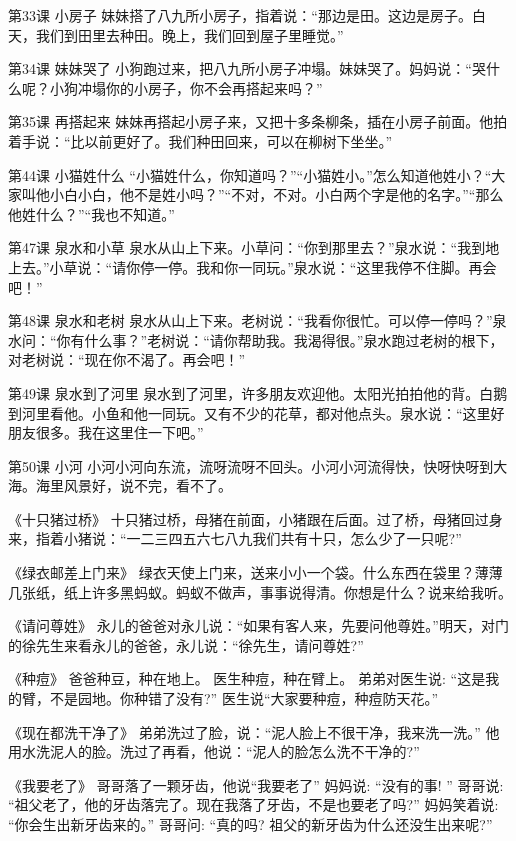 
第33课  小房子
妹妹搭了八九所小房子，指着说：“那边是田。这边是房子。白天，我们到田里去种田。晚上，我们回到屋子里睡觉。”
  
第34课  妹妹哭了
小狗跑过来，把八九所小房子冲塌。妹妹哭了。妈妈说：“哭什么呢？小狗冲塌你的小房子，你不会再搭起来吗？”
 
第35课  再搭起来
妹妹再搭起小房子来，又把十多条柳条，插在小房子前面。他拍着手说：“比以前更好了。我们种田回来，可以在柳树下坐坐。”
 
第44课  小猫姓什么
“小猫姓什么，你知道吗？”“小猫姓小。”怎么知道他姓小？“大家叫他小白小白，他不是姓小吗？”“不对，不对。小白两个字是他的名字。”“那么他姓什么？”“我也不知道。”
 
第47课  泉水和小草
泉水从山上下来。小草问：“你到那里去？”泉水说：“我到地上去。”小草说：“请你停一停。我和你一同玩。”泉水说：“这里我停不住脚。再会吧！”
 
第48课  泉水和老树
泉水从山上下来。老树说：“我看你很忙。可以停一停吗？”泉水问：“你有什么事？”老树说：“请你帮助我。我渴得很。”泉水跑过老树的根下，对老树说：“现在你不渴了。再会吧！”
 
第49课  泉水到了河里
泉水到了河里，许多朋友欢迎他。太阳光拍拍他的背。白鹅到河里看他。小鱼和他一同玩。又有不少的花草，都对他点头。泉水说：“这里好朋友很多。我在这里住一下吧。”
 
第50课  小河
小河小河向东流，流呀流呀不回头。小河小河流得快，快呀快呀到大海。海里风景好，说不完，看不了。
 
 
《十只猪过桥》
十只猪过桥，母猪在前面，小猪跟在后面。过了桥，母猪回过身来，指着小猪说：“一二三四五六七八九我们共有十只，怎么少了一只呢?”
 
《绿衣邮差上门来》
绿衣天使上门来，送来小小一个袋。什么东西在袋里？薄薄几张纸，纸上许多黑蚂蚁。蚂蚁不做声，事事说得清。你想是什么？说来给我听。
 
《请问尊姓》
永儿的爸爸对永儿说：“如果有客人来，先要问他尊姓。”明天，对门的徐先生来看永儿的爸爸，永儿说：“徐先生，请问尊姓?”
 
《种痘》
爸爸种豆，种在地上。
医生种痘，种在臂上。
弟弟对医生说: “这是我的臂，不是园地。你种错了没有?”
医生说“大家要种痘，种痘防天花。”
 
《现在都洗干净了》
弟弟洗过了脸，说：“泥人脸上不很干净，我来洗一洗。”
他用水洗泥人的脸。洗过了再看，他说：“泥人的脸怎么洗不干净的?”
 
《我要老了》
哥哥落了一颗牙齿，他说“我要老了”
妈妈说: “没有的事! ”
哥哥说: “祖父老了，他的牙齿落完了。现在我落了牙齿，不是也要老了吗?”
妈妈笑着说: “你会生出新牙齿来的。”
哥哥问: “真的吗? 祖父的新牙齿为什么还没生出来呢?”
 
